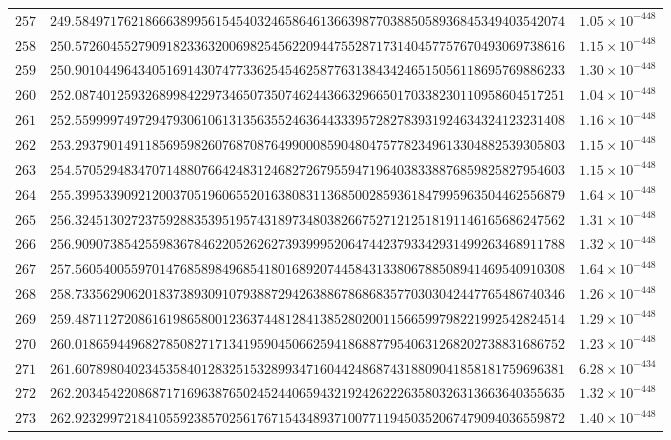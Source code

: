 \documentclass[12pt,reqno]{amsart}
\theoremstyle{remark}
\begin{document}
\begin{longtable}{clc}
$257$ & $249.5849717621866638995615454032465864613663987703885058936845349403542074$ & $1.05\times 10^{-448}$ \\
$258$ & $250.5726045527909182336320069825456220944755287173140457757670493069738616$ & $1.15\times 10^{-448}$ \\
$259$ & $250.9010449643405169143074773362545462587763138434246515056118695769886233$ & $1.30\times 10^{-448}$ \\
$260$ & $252.0874012593268998422973465073507462443663296650170338230110958604517251$ & $1.04\times 10^{-448}$ \\
$261$ & $252.5599997497294793061061313563552463644333957282783931924634324123231408$ & $1.16\times 10^{-448}$ \\
$262$ & $253.2937901491185695982607687087649900085904804757782349613304882539305803$ & $1.15\times 10^{-448}$ \\
$263$ & $254.5705294834707148807664248312468272679559471964038338876859825827954603$ & $1.15\times 10^{-448}$ \\
$264$ & $255.3995339092120037051960655201638083113685002859361847995963504462556879$ & $1.64\times 10^{-448}$ \\
$265$ & $256.3245130272375928835395195743189734803826675271212518191146165686247562$ & $1.31\times 10^{-448}$ \\
$266$ & $256.9090738542559836784622052626273939995206474423793342931499263468911788$ & $1.32\times 10^{-448}$ \\
$267$ & $257.5605400559701476858984968541801689207445843133806788508941469540910308$ & $1.64\times 10^{-448}$ \\
$268$ & $258.7335629062018373893091079388729426388678686835770303042447765486740346$ & $1.26\times 10^{-448}$ \\
$269$ & $259.4871127208616198658001236374481284138528020011566599798221992542824514$ & $1.29\times 10^{-448}$ \\
$270$ & $260.0186594496827850827171341959045066259418688779540631268202738831686752$ & $1.23\times 10^{-448}$ \\
$271$ & $261.6078980402345358401283251532899347160442486874318809041858181759696381$ & $6.28\times 10^{-434}$ \\
$272$ & $262.2034542208687171696387650245244065943219242622263580326313663640355635$ & $1.32\times 10^{-448}$ \\
$273$ & $262.9232997218410559238570256176715434893710077119450352067479094036559872$ & $1.40\times 10^{-448}$ \\

\end{longtable}
\end{document}
